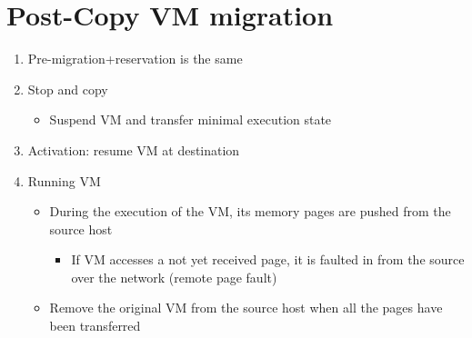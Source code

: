 \section{Post-Copy VM migration}
\begin{enumerate}
  \item Pre-migration+reservation is the same
  \item Stop and copy
  \begin{itemize}
    \item Suspend VM and transfer minimal execution state
  \end{itemize}
  
  \item Activation: resume VM at destination 
  
  \item Running VM
  \begin{itemize}
    \item During the execution of the VM, its memory pages are pushed from the source host
    \begin{itemize}
      \item If VM accesses a not yet received page, it is faulted in from the source over the network (remote page fault)
    \end{itemize}
    \item Remove the original VM from the source host when all the pages have been transferred
  \end{itemize}
\end{enumerate}

